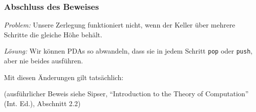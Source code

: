 \documentclass[aspectratio=1610,onlymath]{beamer}
\begin{document}
\begin{frame}\frametitle{Abschluss des Beweises}

\emph{Problem:} Unsere Zerlegung funktioniert nicht, wenn der Keller über mehrere Schritte die gleiche Höhe behält.
\medskip

\emph{Lösung:} Wir können PDAs so abwandeln, dass sie in jedem Schritt \texttt{pop} oder
\texttt{push}, aber nie beides ausführen.


Mit diesen Änderungen gilt tatsächlich:

{\tiny
(ausführlicher Beweis siehe Sipser, "`Introduction to the Theory of Computation"' (Int. Ed.), Abschnitt 2.2)
}

\end{frame}
\end{document}
